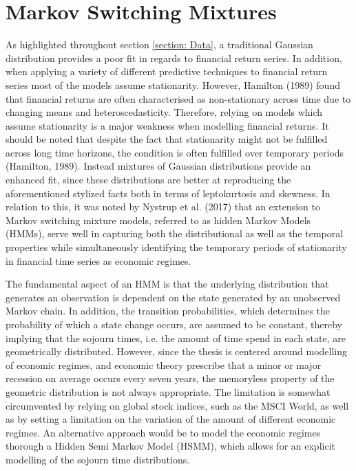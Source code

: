 \newpage
 \section{Markov Switching Mixtures}
As highlighted throughout section \ref{section: Data}, a traditional Gaussian distribution provides a poor fit in regards to financial return series. In addition, when applying a variety of different predictive techniques to financial return series most of the models assume stationarity. However, Hamilton (1989) found that financial returns are often characterised as non-stationary across time due to changing means and heteroscedasticity. Therefore, relying on models which assume stationarity is a major weakness when modelling financial returns. It should be noted that despite the fact that stationarity might not be fulfilled across long time horizons, the condition is often fulfilled over temporary periods (Hamilton, 1989). Instead mixtures of Gaussian distributions provide an enhanced fit, since these distributions are better at reproducing the aforementioned stylized facts both in terms of leptokurtosis and skewness. In relation to this, it was noted by Nystrup et al. (2017) that an extension to Markov switching mixture models, referred to as hidden Markov Models (HMMs), serve well in capturing both the distributional as well as the temporal properties while simultaneously identifying the temporary periods of stationarity in financial time series as economic regimes. 

The fundamental aspect of an HMM is that the underlying distribution that generates an observation is dependent on the state generated by an unobserved Markov chain. In addition, the transition probabilities, which determines the probability of which a state change occurs, are assumed to be constant, thereby implying that the sojourn times, i.e. the amount of time spend in each state, are geometrically distributed. However, since the thesis is centered around modelling of economic regimes, and economic theory prescribe that a minor or major recession on average occurs every seven years, the memoryless property of the geometric distribution is not always appropriate. The limitation is somewhat circumvented by relying on global stock indices, such as the MSCI World, as well as by setting a limitation on the variation of the amount of different economic regimes. An alternative approach would be to model the economic regimes thorough a Hidden Semi Markov Model (HSMM), which allows for an explicit modelling of the sojourn time distributions. 

